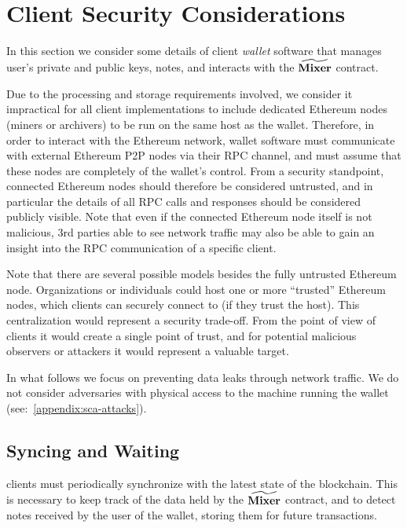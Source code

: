 
\section{Client Security Considerations}\label{client-security}

In this section we consider some details of client \emph{wallet} software that manages user's private and public keys, \zeth{} notes, and interacts with the $\widetilde{\mathbf{Mixer}}$ contract.

Due to the processing and storage requirements involved, we consider it impractical for all \zeth{} client implementations to include dedicated Ethereum nodes (miners or archivers) to be run on the same host as the wallet. Therefore, in order to interact with the Ethereum network, wallet software must communicate with external Ethereum P2P nodes via their RPC channel, and must assume that these nodes are completely of the wallet's control. From a security standpoint, connected Ethereum nodes should therefore be considered untrusted, and in particular the details of all RPC calls and responses should be considered publicly visible. Note that even if the connected Ethereum node itself is not malicious, 3rd parties able to see network traffic may also be able to gain an insight into the RPC communication of a specific \zeth{} client.

\begin{notebox}
    Note that there are several possible models besides the fully untrusted Ethereum node. Organizations or individuals could host one or more ``trusted'' Ethereum nodes, which clients can securely connect to (if they trust the host). This centralization would represent a security trade-off. From the point of view of clients it would create a single point of trust, and for potential malicious observers or attackers it would represent a valuable target.
\end{notebox}

In what follows we focus on preventing data leaks through network traffic. We do not consider adversaries with physical access to the machine running the wallet (see:~\cref{appendix:sca-attacks}).

\subsection{Syncing and Waiting}\label{client-security:syncing}

\zeth{} clients must periodically synchronize with the latest state of the blockchain. This is necessary to keep track of the data held by the $\widetilde{\mathbf{Mixer}}$ contract, and to detect notes received by the user of the wallet, storing them for future transactions.


